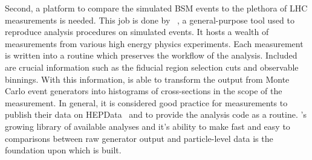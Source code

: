 Second, a platform to compare the simulated BSM events to the plethora of LHC measurements is needed. This job is done by \rivet~\cite{Buckley:2010ar}, a general-purpose tool used to reproduce analysis procedures on simulated events. It hosts a wealth of measurements from various high energy physics experiments. Each measurement is written into a \rivet routine which preserves the workflow of the analysis. Included are crucial information such as the fiducial region selection cuts and observable binnings. With this information, \rivet is able to transform the output from Monte Carlo event generators into histograms of cross-sections in the scope of the measurement. In general, it is considered good practice for \LHC measurements to publish their data on HEPData~\cite{Maguire:2017ypu} and to provide the analysis code as a \rivet routine. \rivet's growing library of available analyses and it's ability to make fast and easy to comparisons between raw generator output and particle-level data is the foundation upon which \contur is built. 

